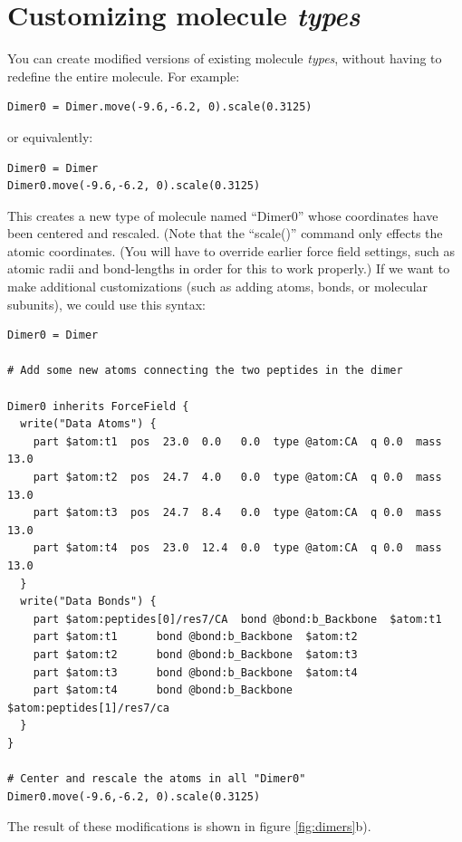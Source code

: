 \documentclass[11pt]{article}
\begin{document}
\section{Customizing molecule \textit{types}}
\label{sec:molecule_customization}
You can create modified versions of existing molecule \textit{types}, 
without having to redefine the entire molecule. For example:
\begin{verbatim}
Dimer0 = Dimer.move(-9.6,-6.2, 0).scale(0.3125)
\end{verbatim}
or equivalently:
\begin{verbatim}
Dimer0 = Dimer
Dimer0.move(-9.6,-6.2, 0).scale(0.3125)
\end{verbatim}
This creates a new type of molecule named ``Dimer0'' whose 
coordinates have been centered and rescaled.
(Note that the ``scale()'' command only effects the atomic coordinates.
(You will have to override earlier force field settings,
such as atomic radii and bond-lengths in order for this to work properly.)
If we want to make additional customizations
(such as adding atoms, bonds, or molecular subunits), we could use this syntax:
\begin{verbatim}
Dimer0 = Dimer

# Add some new atoms connecting the two peptides in the dimer

Dimer0 inherits ForceField {
  write("Data Atoms") {
    part $atom:t1  pos  23.0  0.0   0.0  type @atom:CA  q 0.0  mass 13.0
    part $atom:t2  pos  24.7  4.0   0.0  type @atom:CA  q 0.0  mass 13.0
    part $atom:t3  pos  24.7  8.4   0.0  type @atom:CA  q 0.0  mass 13.0
    part $atom:t4  pos  23.0  12.4  0.0  type @atom:CA  q 0.0  mass 13.0
  }
  write("Data Bonds") {
    part $atom:peptides[0]/res7/CA  bond @bond:b_Backbone  $atom:t1
    part $atom:t1      bond @bond:b_Backbone  $atom:t2
    part $atom:t2      bond @bond:b_Backbone  $atom:t3
    part $atom:t3      bond @bond:b_Backbone  $atom:t4
    part $atom:t4      bond @bond:b_Backbone  $atom:peptides[1]/res7/ca
  }
}

# Center and rescale the atoms in all "Dimer0"
Dimer0.move(-9.6,-6.2, 0).scale(0.3125)
\end{verbatim}
The result of these modifications is shown in figure \ref{fig:dimers}b).
\end{document}
